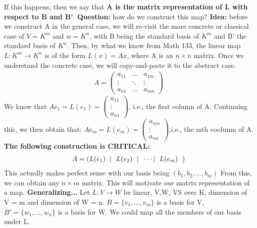\documentclass[a4paper, 12pt]{article}
\theoremstyle{definition}
\theoremstyle{definition}
\theoremstyle{definition}
\theoremstyle{definition}
\begin{document}
{If this happens, then we say that \textbf{A is the matrix representation of L with respect to B and B'}. 
\newline
\newline
\textbf{Question:} how do we construct this map? 
\newline 
\textbf{Idea:} before we construct A in the general case, we will re-visit the more concrete or classical case of $V = K^m$ and $w = K^n$, with B being the standard basis of $K^m$ and B' the standard basis of $K^n$. Then, by what we know from Math 133, the linear map $L: K^m \rightarrow K^n$ is of the form $L(x) = Ax$, where A is an $n \times n$ matrix. Once we understand the concrete case, we will copy-and-paste it to the abstract case. 
\begin{align*}
	A = \begin{pmatrix}
		a_{11} & \hdots & a_{1m} \\
		\vdots & \ddots & \vdots \\
		a_{n1} & \hdots & a_{nm} 
	\end{pmatrix}
\end{align*}
We know that $Ae_1 = L(e_1) = \begin{pmatrix}
	a_{11} \\
	\vdots \\
	a_{n1} 
\end{pmatrix}$, i.e., the first column of A. Continuing this, we then obtain that: $Ae_m = L(e_m) = \begin{pmatrix}
	a_{nm} \\
	\vdots \\
	a_{nn}
\end{pmatrix}$,i.e., the mth coolumn of A. 
\newline
\newline
\textbf{The following construction is CRITICAL:}
\begin{align*}
\huge{
	A = (L(e_1)\ |\ L(e_2)\ |\ \cdots |\ L(e_m)\ )}
\end{align*}
This actually makes perfect sense with our basis being $(b_1, b_2,..., b_m)$ From this, we can obtain any $n \times m$ matrix. This will motivate our matrix representation of a map. 
\newline
\textbf{Generalizing...}
\newline
Let $L: V \rightarrow W$ be linear, V,W, VS over K, dimension of V = m and dimension of W = n. $B = \{ v_1, ..., v_m \}$  is a basis for V, $B' = \{ w_1, ..., w_n \}$ is a basis for W. We could map all the members of our basis under L. 
\newline 
}
\end{document}
